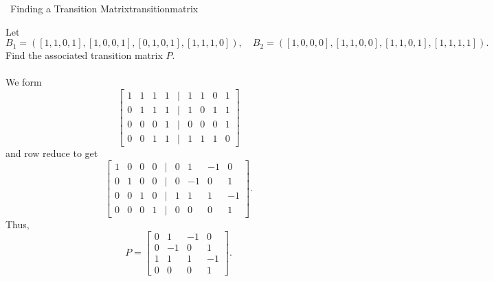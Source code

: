         \begin{example}{\Difficulty\,\Difficulty\,\,Finding a Transition Matrix}{transitionmatrix}

            Let
            \begin{equation*}
                B_1=([1,1,0,1],[1,0,0,1],[0,1,0,1],[1,1,1,0]),\quad B_2=([1,0,0,0],[1,1,0,0],[1,1,0,1],[1,1,1,1]).
            \end{equation*}
            Find the associated transition matrix \(P\).
            \\
            \\
            We form
            \begin{equation*}
                \begin{bmatrix}
                    1 & 1 & 1 & 1 & | & 1 & 1 & 0 & 1 \\
                    0 & 1 & 1 & 1 & | & 1 & 0 & 1 & 1 \\
                    0 & 0 & 0 & 1 & | & 0 & 0 & 0 & 1 \\
                    0 & 0 & 1 & 1 & | & 1 & 1 & 1 & 0
                \end{bmatrix}
            \end{equation*}
            and row reduce to get
            \begin{equation*}
                \begin{bmatrix}
                    1 & 0 & 0 & 0 & | & 0 & 1 & -1 & 0 \\
                    0 & 1 & 0 & 0 & | & 0 & -1 & 0 & 1 \\
                    0 & 0 & 1 & 0 & | & 1 & 1 & 1 & -1 \\
                    0 & 0 & 0 & 1 & | & 0 & 0 & 0 & 1
                \end{bmatrix}.
            \end{equation*}
            Thus, 
            \begin{equation*}
                P=\begin{bmatrix}
                    0 & 1 & -1 & 0 \\
                    0 & -1 & 0 & 1 \\
                    1 & 1 & 1 & -1 \\
                    0 & 0 & 0 & 1
                \end{bmatrix}.
            \end{equation*}
            
        \end{example}
